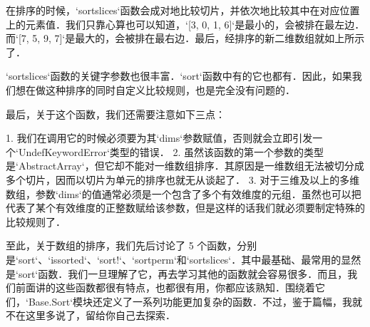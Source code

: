 在排序的时候，`sortslices`函数会成对地比较切片，并依次地比较其中在对应位置上的元素值．我们只靠心算也可以知道，`[3, 0, 1, 6]`是最小的，会被排在最左边．而`[7, 5, 9, 7]`是最大的，会被排在最右边．最后，经排序的新二维数组就如上所示了．

`sortslices`函数的关键字参数也很丰富．`sort`函数中有的它也都有．因此，如果我们想在做这种排序的同时自定义比较规则，也是完全没有问题的．

最后，关于这个函数，我们还需要注意如下三点：

1. 我们在调用它的时候必须要为其`dims`参数赋值，否则就会立即引发一个`UndefKeywordError`类型的错误．
2. 虽然该函数的第一个参数的类型是`AbstractArray`，但它却不能对一维数组排序．其原因是一维数组无法被切分成多个切片，因而以切片为单元的排序也就无从谈起了．
3. 对于三维及以上的多维数组，参数`dims`的值通常必须是一个包含了多个有效维度的元组．虽然也可以把代表了某个有效维度的正整数赋给该参数，但是这样的话我们就必须要制定特殊的比较规则了．

至此，关于数组的排序，我们先后讨论了 5 个函数，分别是`sort`、`issorted`、`sort!`、`sortperm`和`sortslices`．其中最基础、最常用的显然是`sort`函数．我们一旦理解了它，再去学习其他的函数就会容易很多．而且，我们前面讲的这些函数都很有特点，也都很有用，你都应该熟知．围绕着它们，`Base.Sort`模块还定义了一系列功能更加复杂的函数．不过，鉴于篇幅，我就不在这里多说了，留给你自己去探索．